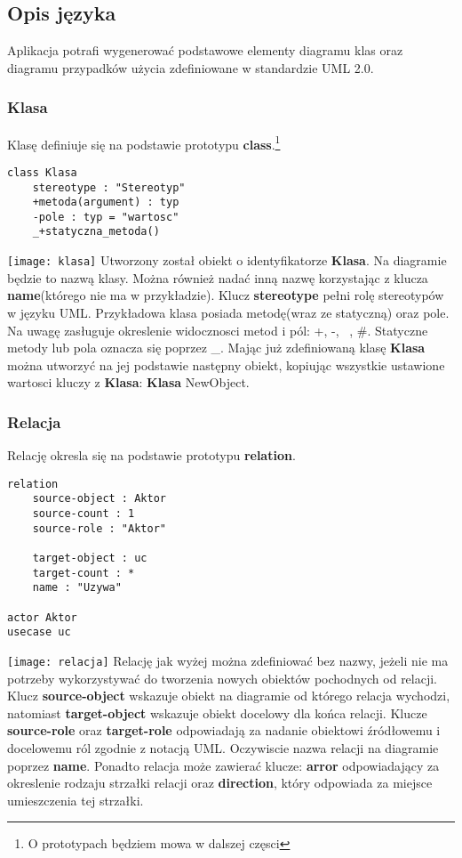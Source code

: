 \subsection{Opis języka}

Aplikacja potrafi wygenerować podstawowe elementy diagramu klas oraz diagramu przypadków użycia zdefiniowane w standardzie UML 2.0.

\subsubsection{Klasa}

Klasę definiuje się na podstawie prototypu \textbf{class}.\footnote{O prototypach będziem mowa w dalszej częsci}

\begin{lstlisting}
class Klasa
    stereotype : "Stereotyp"
    +metoda(argument) : typ
    -pole : typ = "wartosc"
    _+statyczna_metoda()
\end{lstlisting}
\texttt{[image: klasa]}
Utworzony został obiekt o identyfikatorze \textbf{Klasa}. Na diagramie będzie to nazwą klasy. Można również nadać inną nazwę korzystając z klucza \textbf{name}(którego nie ma w przykładzie). Klucz \textbf{stereotype} pełni rolę stereotypów w języku UML. Przykładowa klasa posiada metodę(wraz ze statyczną) oraz pole. Na uwagę zasługuje okreslenie widocznosci metod i pól: +, -, ~, \#. Statyczne metody lub pola oznacza się poprzez \_.
Mając już zdefiniowaną klasę \textbf{Klasa} można utworzyć na jej podstawie następny obiekt, kopiując wszystkie ustawione wartosci kluczy z \textbf{Klasa}: \textbf{Klasa} NewObject.

\subsubsection{Relacja}

Relację okresla się na podstawie prototypu \textbf{relation}.
\begin{lstlisting}
relation
    source-object : Aktor
    source-count : 1
    source-role : "Aktor"

    target-object : uc
    target-count : *
    name : "Uzywa"

actor Aktor
usecase uc
\end{lstlisting}
\texttt{[image: relacja]}
Relację jak wyżej można zdefiniować bez nazwy, jeżeli nie ma potrzeby wykorzystywać do tworzenia nowych obiektów pochodnych od relacji. Klucz \textbf{source-object} wskazuje obiekt na diagramie od którego relacja wychodzi, natomiast \textbf{target-object} wskazuje obiekt docelowy dla końca relacji. Klucze \textbf{source-role} oraz \textbf{target-role} odpowiadają za nadanie obiektowi źródłowemu i docelowemu ról zgodnie z notacją UML. Oczywiscie nazwa relacji na diagramie poprzez \textbf{name}. Ponadto relacja może zawierać klucze: \textbf{arror} odpowiadający za okreslenie rodzaju strzałki relacji oraz \textbf{direction}, który odpowiada za miejsce umieszczenia tej strzałki.

